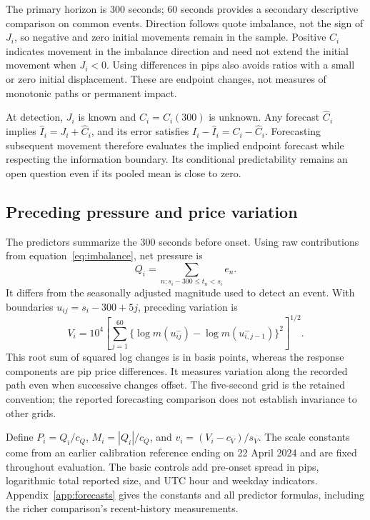 \documentclass[12pt,letterpaper]{article}
\begin{document}
The primary horizon is 300 seconds; 60 seconds provides a secondary descriptive comparison on common events. Direction follows quote imbalance, not the sign of $J_i$, so negative and zero initial movements remain in the sample. Positive $C_i$ indicates movement in the imbalance direction and need not extend the initial movement when $J_i<0$. Using differences in pips also avoids ratios with a small or zero initial displacement. These are endpoint changes, not measures of monotonic paths or permanent impact.

At detection, $J_i$ is known and $C_i=C_i(300)$ is unknown. Any forecast $\widehat C_i$ implies $\widehat I_i=J_i+\widehat C_i$, and its error satisfies $I_i-\widehat I_i=C_i-\widehat C_i$. Forecasting subsequent movement therefore evaluates the implied endpoint forecast while respecting the information boundary. Its conditional predictability remains an open question even if its pooled mean is close to zero.

\subsection{Preceding pressure and price variation}
The predictors summarize the 300 seconds before onset. Using raw contributions from equation~\eqref{eq:imbalance}, net pressure is
\[Q_i=\sum_{n:s_i-300\le t_n<s_i}e_n.\] It differs from the seasonally adjusted magnitude used to detect an event. With boundaries $u_{ij}=s_i-300+5j$, preceding variation is
\begin{equation}
V_i=10^4\left[\sum_{j=1}^{60}
\{\log m(u_{ij}^-)-\log m(u_{i,j-1}^-)\}^2\right]^{1/2}.
\label{eq:variation}\end{equation}
This root sum of squared log changes is in basis points, whereas the response components are pip price differences. It measures variation along the recorded path even when successive changes offset. The five-second grid is the retained convention; the reported forecasting comparison does not establish invariance to other grids.

Define $P_i=Q_i/c_Q$, $M_i=|Q_i|/c_Q$, and $v_i=(V_i-c_V)/s_V$. The scale constants come from an earlier calibration reference ending on 22 April 2024 and are fixed throughout evaluation. The basic controls add pre-onset spread in pips, logarithmic total reported size, and UTC hour and weekday indicators. Appendix~\ref{app:forecasts} gives the constants and all predictor formulas, including the richer comparison's recent-history measurements.
\end{document}
